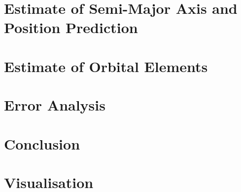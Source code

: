\documentclass{article}
\begin{document}
\section{Estimate of Semi-Major Axis and Position Prediction}

\section{Estimate of Orbital Elements}

\section{Error Analysis}

\section{Conclusion}

\section{Visualisation}

\printbibliography
\end{document}
